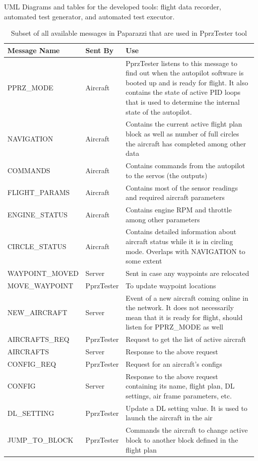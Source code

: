 UML Diagrams and tables for the developed tools: flight data recorder, automated test generator, and automated test executor.
\begin{table}
    \centering
\begin{longtable}{llp{}}
\toprule
\textbf{Message Name }   & \textbf{Sent By }    & \textbf{Use}                                                                     \\ \midrule
\endhead
%
\bottomrule
\endfoot
%
\endlastfoot
%
PPRZ\_MODE &
  Aircraft &
  PprzTester listens to this message to find out when the autopilot software is booted up and is ready for flight. It also contains the state of active PID loops that is used to determine the internal state of the autopilot. \\
NAVIGATION &
  Aircraft &
  Contains the current active flight plan block as well as number of full circles the aircraft has completed among other data \\
COMMANDS        & Aircraft    & Contains commands from the autopilot to the servos (the outputs)       \\
FLIGHT\_PARAMS  & Aircraft    & Contains most of the sensor readings and required aircraft parameters   \\
ENGINE\_STATUS  & Aircraft    & Contains engine RPM and throttle among other parameters                 \\
CIRCLE\_STATUS &
  Aircraft &
  Contains detailed information about aircraft status while it is in circling mode. Overlaps with NAVIGATION to some extent \\
WAYPOINT\_MOVED & Server      & Sent in case any waypoints are relocated                                \\
MOVE\_WAYPOINT  & PprzTester & To update waypoint locations                                            \\
NEW\_AIRCRAFT &
  Server &
  Event of a new aircraft coming online in the network. It does not necessarily mean that it is ready for flight, should listen for PPRZ\_MODE as well \\
AIRCRAFTS\_REQ  & PprzTester & Request to get the list of active aircraft                              \\
AIRCRAFTS       & Server      & Response to the above request                                           \\
CONFIG\_REQ     & PprzTester & Request for an aircraft's configs                                       \\
CONFIG &
  Server &
  Response to the above request containing  its name, flight plan, DL settings, air frame parameters, etc. \\
DL\_SETTING     & PprzTester & Update a DL setting value. It is used to launch the aircraft in the air \\
JUMP\_TO\_BLOCK & PprzTester & Commands the aircraft to change active block to another block defined in the flight plan  \\ \bottomrule
\end{longtable}
\caption{Subset of all available messages in Paparazzi that are used in PprzTester tool}
\label{tab:pprz_messages}
\end{table}

